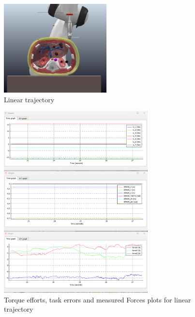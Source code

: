 \documentclass{article}
\begin{document}
\begin{figure}[H]
    \centering
    \includegraphics[width=0.5\textwidth]{Linear_Trajectory.png}  
    \caption{Linear trajectory}
    \label{lin}
\end{figure}
\begin{figure}[H]
    \centering
    \includegraphics[width=0.7\textwidth]{Linear_graphs.png}  
    \caption{Torque efforts, task errors and measured Forces plots for linear trajectory}
    \label{graphs}
\end{figure}
\end{document}
